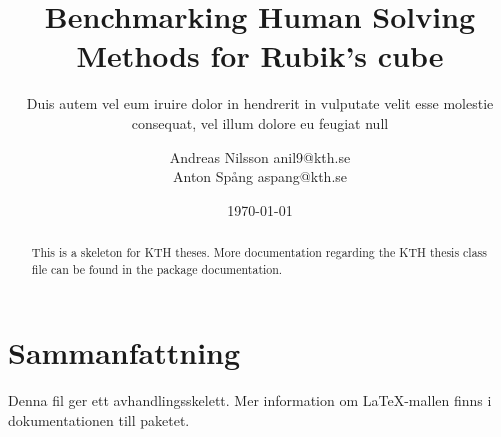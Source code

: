 \documentclass[a4paper,11pt]{kth-mag}
\title{Benchmarking Human Solving Methods for
           Rubik's cube}
\subtitle{Duis autem vel eum iruire dolor in hendrerit in
          vulputate velit esse molestie consequat, vel illum
          dolore eu feugiat null}
\author{Andreas Nilsson  anil9@kth.se\\Anton Spång  aspang@kth.se}
\date{\today}
\begin{document}
\frontmatter
\pagestyle{empty}
\removepagenumbers
\maketitle
{}
\begin{abstract}
  This is a skeleton for KTH theses. More documentation
  regarding the KTH thesis class file can be found in
  the package documentation.


\end{abstract}
\clearpage
\section{Sammanfattning}
  Denna fil ger ett avhandlingsskelett.
  Mer information om \LaTeX-mallen finns i
  dokumentationen till paketet.


\clearpage
\tableofcontents*
\mainmatter
\pagestyle{newchap}
\end{document}
